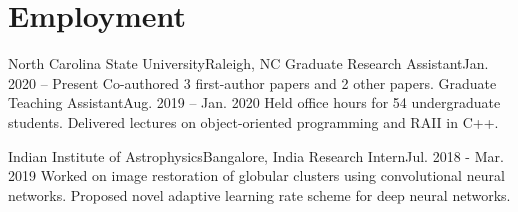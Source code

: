 \section{Employment}
  \resumeSubHeadingListStart

    \resumeSubheading
      {North Carolina State University}{Raleigh, NC}
      {Graduate Research Assistant}{Jan. 2020 -- Present}
      \resumeItemListStart
          {Co-authored 3 first-author papers and 2 other papers.}
      \resumeItemListEnd
    \addExtraPosition
      {Graduate Teaching Assistant}{Aug. 2019 -- Jan. 2020}
      \resumeItemListStart
          {Held office hours for 54 undergraduate students.}
          {Delivered lectures on object-oriented programming and RAII in C++.}
      \resumeItemListEnd

    \resumeSubheading
      {Indian Institute of Astrophysics}{Bangalore, India}
      {Research Intern}{Jul. 2018 - Mar. 2019}
      \resumeItemListStart
          {Worked on image restoration of globular clusters using convolutional neural networks.}
          {Proposed novel adaptive learning rate scheme for deep neural networks.}
      \resumeItemListEnd
      
  \resumeSubHeadingListEnd
